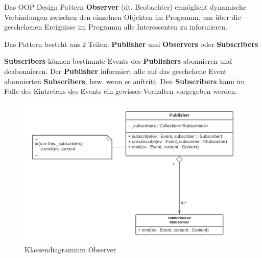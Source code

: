 Das OOP Design Pattern \textbf{Observer} (dt. Beobachter) ermöglicht dynamische Verbindungen zwischen den einzelnen 
Objekten im Programm, um über die geschehenen Ereignisse im Programm alle Interessenten 
zu informieren.

Das Pattern besteht aus 2 Teilen: \textbf{Publisher} und \textbf{Observers} oder \textbf{Subscribers}

\textbf{Subscribers} können bestimmte Events des \textbf{Publishers} abonnieren und deabonnieren. 
Der \textbf{Publisher} informiert alle auf das geschehene Event abonnierten \textbf{Subscribers}, bzw. wenn es auftritt. 
Den \textbf{Subscribers} kann im Falle des Eintretens des Events ein gewisses Verhalten vorgegeben werden.

\begin{figure}[H]
    \centering
    \includegraphics[width=1\textwidth]{Images/Observer.png}
    \caption[UML Observer]{Klassendiagrammm Observer}
    \label{fig:cd_observer}
\end{figure}